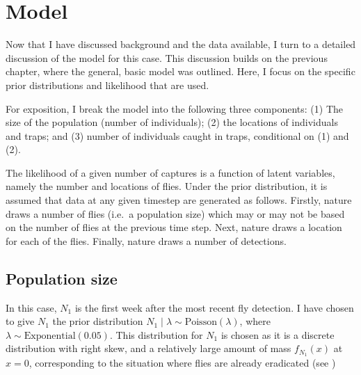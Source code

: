 \documentclass[
]{book}
\begin{document}
\hypertarget{model}{%
\section{Model}\label{model}}

Now that I have discussed background and the data available, I turn to a detailed discussion of the model for this case. This discussion builds on the previous chapter, where the general, basic model was outlined. Here, I focus on the specific prior distributions and likelihood that are used.

For exposition, I break the model into the following three components: (1) The size of the population (number of individuals); (2) the locations of individuals and traps; and (3) number of individuals caught in traps, conditional on (1) and (2).

The likelihood of a given number of captures is a function of latent variables, namely the number and locations of flies. Under the prior distribution, it is assumed that data at any given timestep are generated as follows. Firstly, nature draws a number of flies (i.e.~a population size) which may or may not be based on the number of flies at the previous time step. Next, nature draws a location for each of the flies. Finally, nature draws a number of detections.

\hypertarget{population-size-1}{%
\subsection{Population size}\label{population-size-1}}

In this case, \(N_1\) is the first week after the most recent fly detection. I have chosen to give \(N_1\) the prior distribution \(N_1 \mid \lambda \sim \mathrm{Poisson}(\lambda)\), where \(\lambda \sim \mathrm{Exponential}(0.05)\). This distribution for \(N_1\) is chosen as it is a discrete distribution with right skew, and a relatively large amount of mass \(f_{N_1}(x)\) at \(x = 0\), corresponding to the situation where flies are already eradicated (see \citet{prior_init_size})
\end{document}
